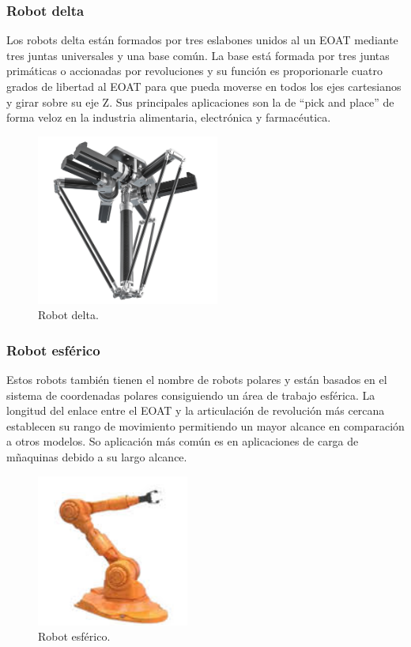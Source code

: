 \subsubsection{Robot delta}
Los robots delta están formados por tres eslabones unidos al un EOAT mediante tres juntas universales y una base común. La base está formada por tres juntas primáticas o accionadas por revoluciones y su función es proporionarle cuatro grados de libertad al EOAT para que pueda moverse en todos los ejes cartesianos y girar sobre su eje Z. Sus principales aplicaciones son la de ``pick and place'' de forma veloz en la industria alimentaria, electrónica y farmacéutica.


\begin{figure} [h!]
  \begin{center}
    \includegraphics[width=6cm]{figs/robot_delta}
  \end{center}
  \caption{\centering Robot delta.}
  \label{fig:robot_delta}
\end{figure} 

\subsubsection{Robot esférico}

Estos robots también tienen el nombre de robots polares y están basados en el sistema de coordenadas polares consiguiendo un área de trabajo esférica. La longitud del enlace entre el EOAT y la articulación de revolución más cercana establecen su rango de movimiento permitiendo un mayor alcance en comparación a otros modelos. So aplicación más común es en aplicaciones de carga de mñaquinas debido a su largo alcance.

\begin{figure} [h!]
  \begin{center}
    \includegraphics[width=5cm]{figs/robot_esferico}
  \end{center}
  \caption{\centering Robot esférico.}
  \label{fig:robot_esferico}
\end{figure} 


